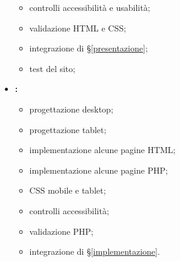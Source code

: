 \begin{itemize}
\begin{itemize}
			\item controlli accessibilità e usabilità;
			\item validazione HTML e CSS;
			\item integrazione di §\ref{presentazione};
			\item test del sito;
		\end{itemize}
	\item \textbf{\toffo:}
		\begin{itemize}
			\item progettazione desktop;
			\item progettazione tablet;
			\item implementazione alcune pagine HTML;
			\item implementazione alcune pagine PHP;
			\item CSS mobile e tablet;
			\item controlli accessibilità;
			\item validazione PHP;
			\item integrazione di §\ref{implementazione}.
		\end{itemize}
\end{itemize}